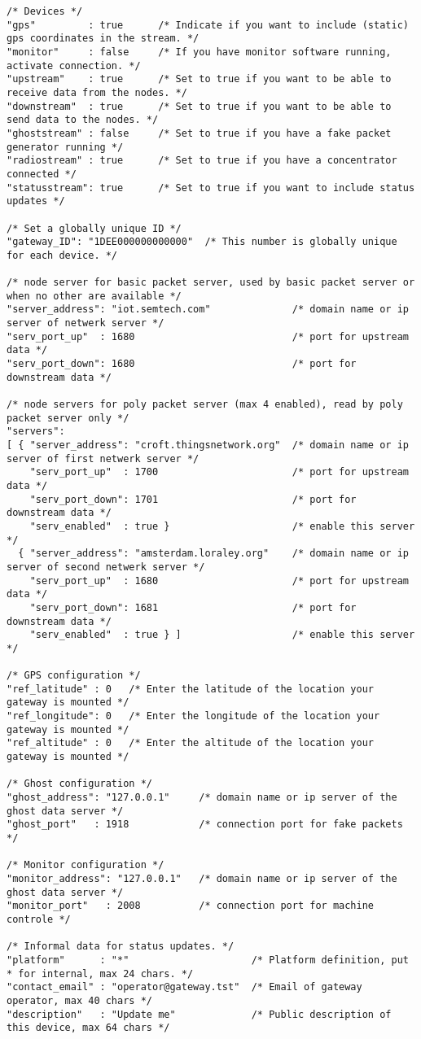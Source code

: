 \documentclass[12pt]{article}
\begin{document}
\smaller[2]
\begin{verbatim}
/* Devices */
"gps"         : true      /* Indicate if you want to include (static) gps coordinates in the stream. */
"monitor"     : false     /* If you have monitor software running, activate connection. */
"upstream"    : true      /* Set to true if you want to be able to receive data from the nodes. */
"downstream"  : true      /* Set to true if you want to be able to send data to the nodes. */
"ghoststream" : false     /* Set to true if you have a fake packet generator running */
"radiostream" : true      /* Set to true if you have a concentrator connected */
"statusstream": true      /* Set to true if you want to include status updates */

/* Set a globally unique ID */
"gateway_ID": "1DEE000000000000"  /* This number is globally unique for each device. */

/* node server for basic packet server, used by basic packet server or when no other are available */
"server_address": "iot.semtech.com"              /* domain name or ip server of netwerk server */
"serv_port_up"  : 1680                           /* port for upstream data */
"serv_port_down": 1680                           /* port for downstream data */ 
       
/* node servers for poly packet server (max 4 enabled), read by poly packet server only */
"servers":
[ { "server_address": "croft.thingsnetwork.org"  /* domain name or ip server of first netwerk server */
    "serv_port_up"  : 1700                       /* port for upstream data */
    "serv_port_down": 1701                       /* port for downstream data */ 
    "serv_enabled"  : true }                     /* enable this server */
  { "server_address": "amsterdam.loraley.org"    /* domain name or ip server of second netwerk server */
    "serv_port_up"  : 1680                       /* port for upstream data */
    "serv_port_down": 1681                       /* port for downstream data */ 
    "serv_enabled"  : true } ]                   /* enable this server */
                
/* GPS configuration */
"ref_latitude" : 0   /* Enter the latitude of the location your gateway is mounted */
"ref_longitude": 0   /* Enter the longitude of the location your gateway is mounted */
"ref_altitude" : 0   /* Enter the altitude of the location your gateway is mounted */

/* Ghost configuration */
"ghost_address": "127.0.0.1"     /* domain name or ip server of the ghost data server */
"ghost_port"   : 1918            /* connection port for fake packets */ 

/* Monitor configuration */      
"monitor_address": "127.0.0.1"   /* domain name or ip server of the ghost data server */
"monitor_port"   : 2008          /* connection port for machine controle */ 

/* Informal data for status updates. */
"platform"      : "*"                     /* Platform definition, put * for internal, max 24 chars. */
"contact_email" : "operator@gateway.tst"  /* Email of gateway operator, max 40 chars */
"description"   : "Update me"             /* Public description of this device, max 64 chars */


\end{verbatim} 
\end{document}

